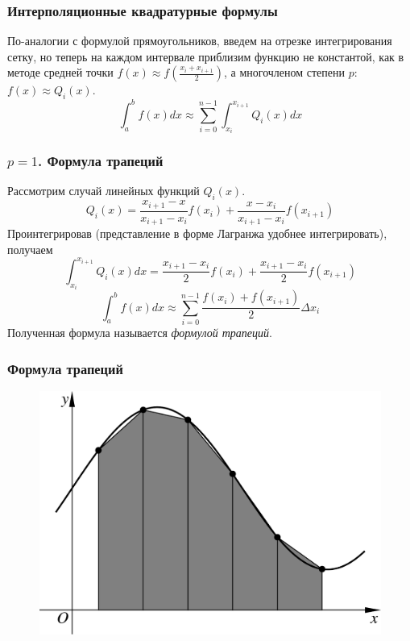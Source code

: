 \documentclass[aspectratio=169,unicode]{beamer}
\begin{document}
\begin{frame}
\frametitle{Интерполяционные квадратурные формулы}
	По-аналогии с формулой прямоугольников, введем на отрезке интегрирования сетку, но теперь на каждом
	интервале приблизим функцию не константой, как в методе средней точки $f(x) \approx f\left(\frac{x_i+x_{i+1}}{2}\right)$,
	а многочленом степени $p$: $f(x) \approx Q_i(x)$.
	\[
	\int_a^b f(x) dx\approx \sum_{i=0}^{n-1} \int_{x_i}^{x_{i+1}} Q_i(x) dx
	\]
\end{frame}

\begin{frame}
\frametitle{$p=1$. Формула трапеций}
	Рассмотрим случай линейных функций $Q_i(x)$.
	\[
	Q_i(x) =
	\frac{x_{i+1}-x}{x_{i+1}-x_i} f(x_i) + \frac{x-x_i}{x_{i+1}-x_i} f(x_{i+1})
	\]
	\pause
	Проинтегрировав (представление в форме Лагранжа удобнее интегрировать), получаем
	\[
	\int_{x_i}^{x_{i+1}} Q_i(x) dx = \frac{x_{i+1}-x_i}{2} f(x_i) + \frac{x_{i+1}-x_i}{2} f(x_{i+1})
	\]
	\[
	\int_a^b f(x) dx \approx \sum_{i=0}^{n-1} \frac{f(x_i)+f(x_{i+1})}{2} \Delta x_i
	\]
	Полученная формула называется \emph{формулой трапеций}.
\end{frame}

\begin{frame}
\frametitle{Формула трапеций}
	\begin{figure}%
	\includegraphics[height=.8\textheight]{trap.pdf}%
	\end{figure}
\end{frame}
\end{document}
